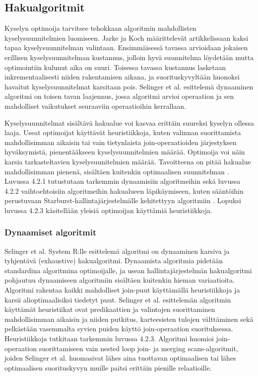 \documentclass[finnish]{tktltiki2}
\theoremstyle{definition}
\theoremstyle{remark}
\begin{document}
\subsection{Hakualgoritmit}
Kyselyn optimoija tarvitsee tehokkaan algoritmin mahdollisten kyselysuunnitelmien luomiseen. Jarke ja Koch määrittelevät artikkelissaan \cite{jarke1984} kaksi tapaa kyselysuunnitelman valintaan. Ensimmäisessä tavassa arvioidaan jokaisen erillisen kyselysuunnitelman kustannus, jolloin hyvä suunnitelma löydetään mutta optimointiin kulunut aika on suuri. Toisessa tavassa kustannus lasketaan inkrementaalisesti niiden rakentamisen aikana, ja suorituskyvyltään huonoksi havaitut kyselysuunnitelmat karsitaan pois. Selinger et al. esittelemä dynaaminen algoritmi \cite{selinger1979access} on toisen tavan laajennus, jossa algoritmi arvioi operaation ja sen mahdolliset vaikutukset seuraaviin operaatioihin kerrallaan. 

Kyselysuunnitelmat sisältävä hakualue voi kasvaa erittäin suureksi kyselyn ollessa laaja. Useat optimoijat käyttävät heuristiikkoja, kuten valinnan suorittamista mahdollisimman aikaisin tai vain tietynlaista join-operaatioiden järjestyksen hyväksymistä, pienentääkseen kyselysuunnitelmien määrää. Optimoija voi näin karsia tarkasteltavien kyselysuunitelmien määrää. Tavoitteena on pitää hakualue mahdollisimman pienenä, sisältäen kuitenkin optimaalisen suunnitelman \cite{jarke1984}. Luvussa 4.2.1 tutustutaan tarkemmin dynaamisiin algoritmeihin sekä luvussa 4.2.2 vaihtoehtoisiin algoritmeihin hakualueen läpikäymiseen, kuten sääntöihin perustuvaan Starburst-hallintajärjestelmälle kehitettyyn algoritmiin \cite{lohman1988grammar}. Lopuksi luvussa 4.2.3 käsitellään yleisiä optimoijan käyttämiä heuristiikkoja.

\subsubsection{Dynaamiset algoritmit}
Selinger et al. System R:lle esittelemä algoritmi on dynaaminen karsiva ja tyhjentävä (exhaustive) hakualgoritmi. Dynaamista algoritmia pidetään standardina algoritmina optimoijalle, ja usean hallintajärjestelmän hakualgoritmi pohjautuu dynaamiseen algoritmiin sisältäen kuitenkin hieman variaatioita. Algoritmi rakentaa kaikki mahdolliset join-puut käyttämällä heuristiikkoja ja karsii alioptimaalisiksi tiedetyt puut. Selinger et al. esittelemän algoritmin käyttämät heuristiikat ovat predikaattien ja valintojen suorittaminen mahdollisimman aikaisin ja niiden putkitus, karteesisten tulojen välttäminen sekä pelkästään vasemmalta syvien puiden käyttö join-operaation suorituksessa. Heuristiikkoja tutkitaan tarkemmin luvussa 4.2.3. Algoritmi huomioi join-operaation suorittamiseen vain nested loop join- ja merging scans-algoritmit, joiden Selinger et al. huomasivat lähes aina tuottavan optimaalisen tai lähes optimaalisen suorituskyvyn muille paitsi erittäin pienille relaatioille.
\end{document}
